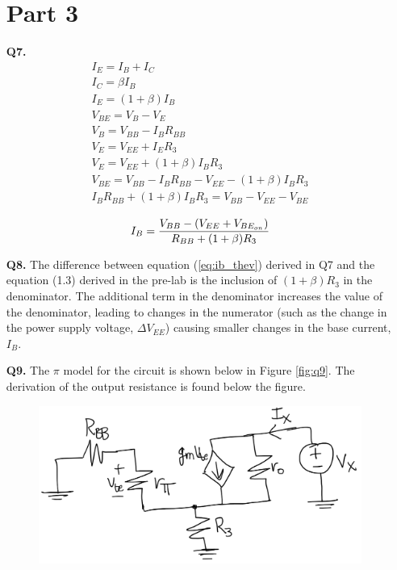 \documentclass[12pt]{article}
\begin{document}
\begin{itemize}
    \section*{Part 3}
    \item [\textbf{Q7.}]
    \begin{equation*}
    \begin{gathered}
        I_E = I_B + I_C \\
        I_C = \beta I_B \\
        I_E = (1+\beta) I_B \\
        V_{BE} = V_B - V_E \\
        V_B = V_{BB} - I_B R_{BB} \\
        V_E = V_{EE} + I_E R_3 \\
        V_E = V_{EE} + (1+\beta) I_B R_3 \\
        V_{BE} = V_{BB} - I_B R_{BB} - V_{EE} - (1+\beta) I_B R_3 \\
        I_B  R_{BB} + (1+\beta) I_B R_3 = V_{BB} - V_{EE} - V_{BE} \\
    \end{gathered}
    \end{equation*}
    \begin{equation} \label{eq:ib_thev}
        I_B = \frac{V_{BB} - (V_{EE} + V_{BE_{on}})}{R_{BB} + (1+\beta) R_3} \\
    \end{equation}
    \item [\textbf{Q8.}]
    The difference between equation (\ref{eq:ib_thev}) derived in Q7 and the equation (1.3) derived in the pre-lab is the inclusion of $(1+\beta)R_3$ in the denominator. The additional term in the denominator  increases the value of the denominator, leading to changes in the numerator (such as the change in the power supply voltage, $\Delta V_{EE}$) causing smaller changes in the base current, $I_B$.
    \item [\textbf{Q9.}]
    The $\pi$ model for the circuit is shown below in Figure \ref{fig:q9}. The derivation of the output resistance is found below the figure.
    \begin{figure}[ht!]
        \includegraphics[width=\textwidth]{Q9.PNG}

\end{figure}
\end{itemize}
\end{document}
